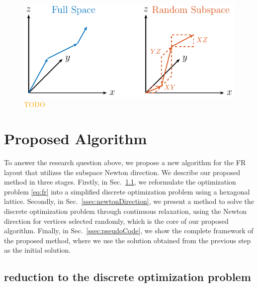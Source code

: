 \documentclass[dvipdfmx,10pt,journal,compsoc]{IEEEtran}
\newcommand{\orange}[1]{\textcolor{orange}{#1}}
\begin{document}
\begin{figure}[t]
    \centering
    \includegraphics[width=\columnwidth]{subspace/subspace.pdf}
    \caption{\orange{TODO}}
    \label{fig:subspace}
\end{figure}

\section{Proposed Algorithm}\label{sec:algorithm}

To answer the research question above, we propose a new algorithm for the FR layout that utilizes the subspace Newton direction.
We describe our proposed method in three stages.
Firstly, in Sec.~\ref{ssec:reduction}, we reformulate the optimization problem \eqref{eq:fr} into a simplified discrete optimization problem using a hexagonal lattice.
Secondly, in Sec.~\ref{ssec:newtonDirection}, we present a method to solve the discrete optimization problem through continuous relaxation, using the Newton direction for vertices selected randomly, which is the core of our proposed algorithm.
Finally, in Sec.~\ref{ssec:pseudoCode}, we show the complete framework of the proposed method, where we use the solution obtained from the previous step as the initial solution.

\subsection{reduction to the discrete optimization problem}\label{ssec:reduction}
\end{document}
